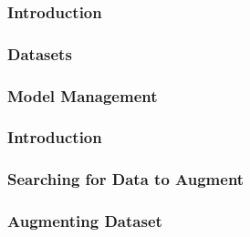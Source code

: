 \documentclass[runningheads,a4paper]{llncs}
\begin{document}
\subsubsection*{Introduction} 


\subsubsection*{Datasets}


\subsubsection*{Model Management} 


\subsubsection*{Introduction} 


\subsubsection*{Searching for Data to Augment} 


\subsubsection*{Augmenting Dataset} 




\end{document}
